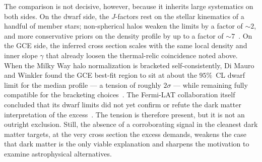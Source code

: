 The comparison is not decisive, however, because it inherits large systematics on both sides.
On the dwarf side, the $J$-factors rest on the stellar kinematics of a handful of member stars; non-spherical halos weaken the limits by a factor of $\sim 2$, and more conservative priors on the density profile by up to a factor of $\sim 7$~\cite{Murgia:2020dzu}.
On the GCE side, the inferred cross section scales with the same local density and inner slope $\gamma$ that already loosen the thermal-relic coincidence noted above.
When the Milky Way halo normalization is bracketed self-consistently, Di Mauro and Winkler found the GCE best-fit region to sit at about the $95\%$~CL dwarf limit for the median profile --- a tension of roughly $2\sigma$ --- while remaining fully compatible for the bracketing choices~\cite{DiMauro:2021qcf}.
The Fermi-LAT collaboration itself concluded that its dwarf limits did not yet confirm or refute the dark matter interpretation of the excess~\cite{Fermi-LAT:2016uux}.
The tension is therefore present, but it is not an outright exclusion.
Still, the absence of a corroborating signal in the cleanest dark matter targets, at the very cross section the excess demands, weakens the case that dark matter is the only viable explanation and sharpens the motivation to examine astrophysical alternatives.
